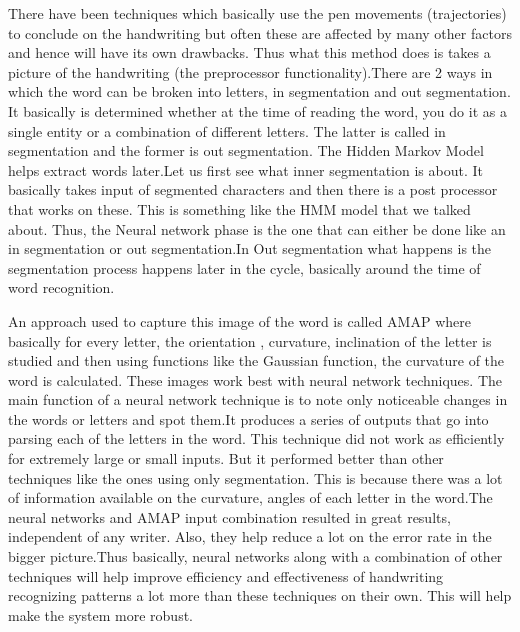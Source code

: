 \documentclass[12pt]{article}  %
\begin{document}
There have been techniques which basically use the pen movements (trajectories) to conclude on the handwriting but often these are affected by many other factors and hence will have its own drawbacks. Thus what this method does is takes a picture of the handwriting (the preprocessor functionality).There are 2 ways in which the word can be broken into letters, in segmentation and out segmentation. It basically is determined whether at the time of reading the word, you do it as a single entity or a combination of different letters. The latter is called in segmentation and the former is out segmentation. The Hidden Markov Model helps extract words later.Let us first see what inner segmentation is about. It basically takes input of segmented characters and then there is a post processor that works on these. This is something like the HMM model that we talked about. Thus, the Neural network phase is the one that can either be done like an in segmentation or out segmentation.In Out segmentation what happens is the segmentation process happens later in the cycle, basically around the time of word recognition.
 
An approach used to capture this image of the word is called AMAP where basically for every letter, the orientation , curvature, inclination of the letter is studied and then using functions like the Gaussian function, the curvature of the word is calculated. These images work best with neural network techniques.  The main function of a neural network technique is to note only noticeable changes in the words or letters and spot them.It produces a series of outputs that go into parsing each of the letters in the word.  This technique did not work as efficiently for extremely large or small inputs. But it performed better than other techniques like the ones using only segmentation. This is because there was a lot of information available on the curvature, angles of each letter in the word.The neural networks and AMAP input combination resulted in great results, independent of any writer. Also, they help reduce a lot on the error rate in the bigger picture.Thus basically, neural networks along with a combination of other techniques will help improve efficiency and effectiveness of handwriting recognizing patterns a lot more than these techniques on their own.
This will help make the system more robust.
\end{document}
